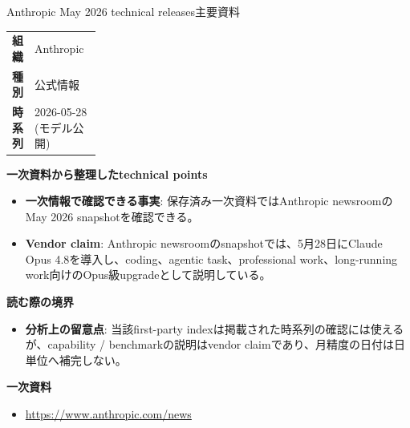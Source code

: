 \begin{technicalnote}{Anthropic May 2026 technical releases}{主要資料}
\begingroup
\begin{tabularx}{\linewidth}{@{}>{\bfseries}p{0.22\linewidth}X@{}}
組織 & Anthropic \\
種別 & 公式情報 \\
時系列 & 2026-05-28 (モデル公開) \\
\end{tabularx}
\smallskip
{\bfseries 一次資料から整理したtechnical points}
\begin{itemize}[leftmargin=1.5em,itemsep=0.35em]
\item \textbf{一次情報で確認できる事実}: 保存済み一次資料ではAnthropic newsroomのMay 2026 snapshotを確認できる。
\end{itemize}
\begin{minipage}{\linewidth}
\begin{itemize}[leftmargin=1.5em,itemsep=0.35em]
\item \textbf{Vendor claim}: Anthropic newsroomのsnapshotでは、5月28日にClaude Opus 4.8を導入し、coding、agentic task、professional work、long-running work向けのOpus級upgradeとして説明している。
\end{itemize}
{\bfseries 読む際の境界}
\begin{itemize}[leftmargin=1.5em,itemsep=0.35em]
\item \textbf{分析上の留意点}: 当該first-party indexは掲載された時系列の確認には使えるが、capability / benchmarkの説明はvendor claimであり、月精度の日付は日単位へ補完しない。
\end{itemize}
\begin{samepage}
{\bfseries 一次資料}
\begingroup\sloppy
\begin{itemize}[leftmargin=1.5em,itemsep=0.25em]
\item {\scriptsize\url{https://www.anthropic.com/news}}
\end{itemize}
\endgroup
\end{samepage}
\end{minipage}
\endgroup
\end{technicalnote}
\medskip

